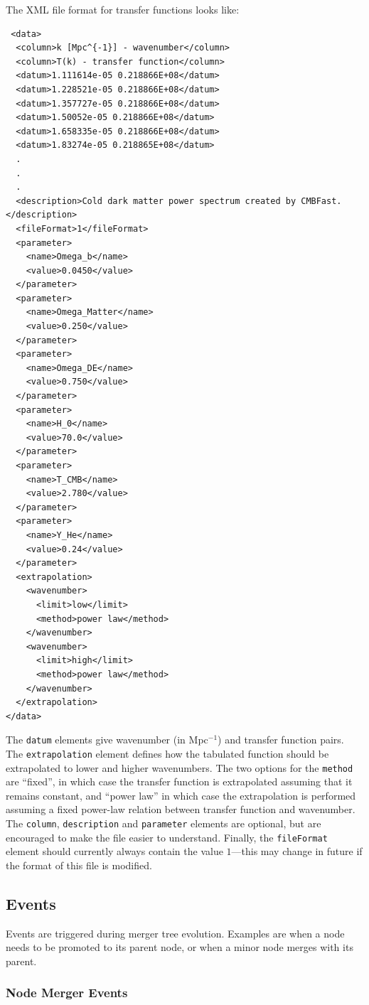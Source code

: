 The XML file format for transfer functions looks like:
\begin{verbatim}
 <data>
  <column>k [Mpc^{-1}] - wavenumber</column>
  <column>T(k) - transfer function</column>
  <datum>1.111614e-05 0.218866E+08</datum>
  <datum>1.228521e-05 0.218866E+08</datum>
  <datum>1.357727e-05 0.218866E+08</datum>
  <datum>1.50052e-05 0.218866E+08</datum>
  <datum>1.658335e-05 0.218866E+08</datum>
  <datum>1.83274e-05 0.218865E+08</datum>
  .
  .
  .
  <description>Cold dark matter power spectrum created by CMBFast.</description>
  <fileFormat>1</fileFormat>
  <parameter>
    <name>Omega_b</name>
    <value>0.0450</value>
  </parameter>
  <parameter>
    <name>Omega_Matter</name>
    <value>0.250</value>
  </parameter>
  <parameter>
    <name>Omega_DE</name>
    <value>0.750</value>
  </parameter>
  <parameter>
    <name>H_0</name>
    <value>70.0</value>
  </parameter>
  <parameter>
    <name>T_CMB</name>
    <value>2.780</value>
  </parameter>
  <parameter>
    <name>Y_He</name>
    <value>0.24</value>
  </parameter>
  <extrapolation>
    <wavenumber>
      <limit>low</limit>
      <method>power law</method>
    </wavenumber>
    <wavenumber>
      <limit>high</limit>
      <method>power law</method>
    </wavenumber>
  </extrapolation>
</data>
\end{verbatim}
The {\tt datum} elements give wavenumber (in Mpc$^{-1}$) and transfer function pairs. The {\tt extrapolation} element defines how the tabulated function should be extrapolated to lower and higher wavenumbers. The two options for the {\tt method} are ``fixed'', in which case the transfer function is extrapolated assuming that it remains constant, and ``power law'' in which case the extrapolation is performed assuming a fixed power-law relation between transfer function and wavenumber. The {\tt column}, {\tt description} and {\tt parameter} elements are optional, but are encouraged to make the file easier to understand. Finally, the {\tt fileFormat} element should currently always contain the value $1$---this may change in future if the format of this file is modified.

\subsection{Events}

Events are triggered during merger tree evolution. Examples are when a node needs to be promoted to its parent node, or when a minor node merges with its parent.

\subsubsection{Node Merger Events}


